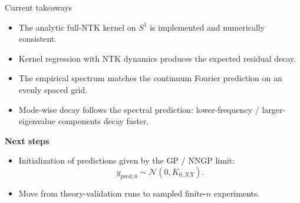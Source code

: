 \documentclass[10pt,aspectratio=169]{beamer}
\begin{document}
\begin{frame}{Current takeaways}
	\small
	\begin{itemize}
		\item The analytic full-NTK kernel on $S^1$ is implemented and numerically consistent.
		\item Kernel regression with NTK dynamics produces the expected residual decay.
		\item The empirical spectrum matches the continuum Fourier prediction on an evenly spaced grid.
		\item Mode-wise decay follows the spectral prediction:
		      lower-frequency / larger-eigenvalue components decay faster.
	\end{itemize}

	\medskip
	\textbf{Next steps}
	\begin{itemize}
		\item Initialization of predictions given by the GP / NNGP limit:
		      \[
			      y_{\mathrm{pred},0} \sim \mathcal{N}(0, K_{0,XX}).
		      \]
		\item Move from theory-validation runs to sampled finite-$n$ experiments.
	\end{itemize}

\end{frame}
\end{document}
